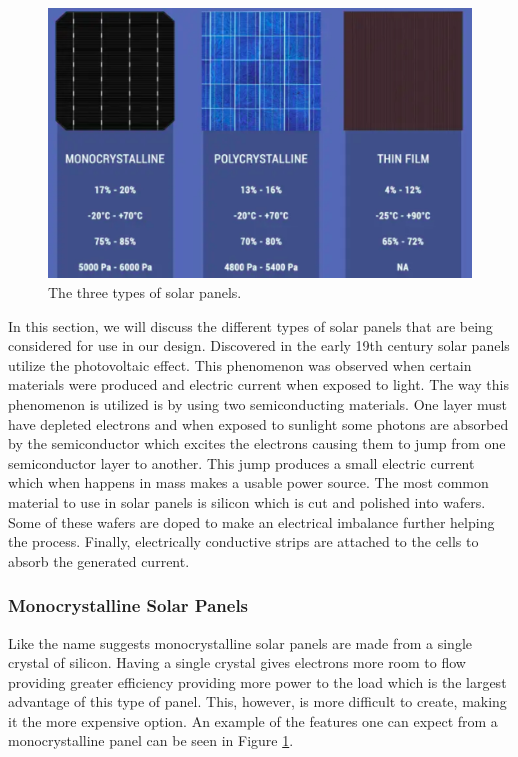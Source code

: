 \begin{figure}
    \centering
    \includegraphics[scale=0.25]{figures/solar panel overview.png}
    \caption{The three types of solar panels.}
    \label{solar-panel-overview} 
\end{figure}

In this section, we will discuss the different types of solar panels that are being considered for use in our design. Discovered in the early 19th century solar panels utilize the photovoltaic effect. This phenomenon was observed when certain materials were produced and electric current when exposed to light. The way this phenomenon is utilized is by using two semiconducting materials. One layer must have depleted electrons and when exposed to sunlight some photons are absorbed by the semiconductor which excites the electrons causing them to jump from one semiconductor layer to another. This jump produces a small electric current which when happens in mass makes a usable power source. The most common material to use in solar panels is silicon which is cut and polished into wafers. Some of these wafers are doped to make an electrical imbalance further helping the process. Finally, electrically conductive strips are attached to the cells to absorb the generated current. 

\subsubsection{Monocrystalline Solar Panels}

Like the name suggests monocrystalline solar panels are made from a single crystal of silicon. Having a single crystal gives electrons more room to flow providing greater efficiency providing more power to the load which is the largest advantage of this type of panel. This, however, is more difficult to create, making it the more expensive option. An example of the features one can expect from a monocrystalline panel can be seen in Figure \ref{solar-panel-overview}. 

